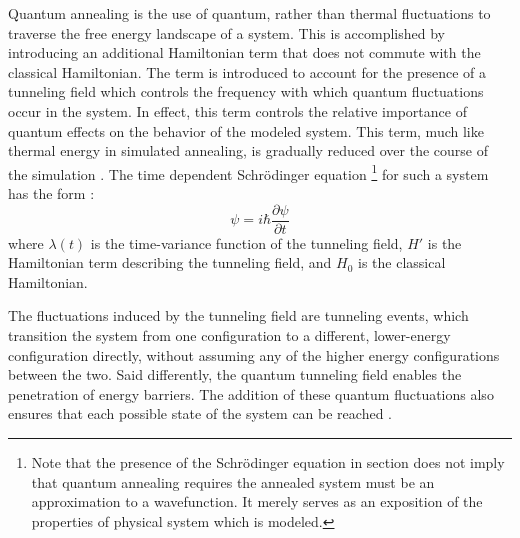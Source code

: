 \documentclass[11pt]{afthesis}
\begin{document}
	Quantum annealing is the use of quantum, rather than thermal fluctuations to traverse the free energy landscape of a system. This is accomplished by introducing an additional Hamiltonian term that does not commute with the classical Hamiltonian. The term is introduced to account for the presence of a tunneling field which controls the frequency with which quantum fluctuations occur in the system. In effect, this term controls the relative importance of quantum effects on the behavior of the modeled system. This term, much like thermal energy in simulated annealing, is gradually reduced over the course of the simulation \cite{das2005qakcs}. The time dependent Schrödinger equation \footnote{Note that the presence of the Schrödinger equation in section does not imply that quantum annealing requires the annealed system must be an approximation to a wavefunction. It merely serves as an exposition of the properties of physical system which is modeled.} for such a system has the form \cite{mukherjee2015multivariatesearchqa}: \begin{equation}
	[\lambda(t)H' + H_0]\psi = i\hbar \frac{\partial \psi}{\partial t}
	\end{equation} where \begin{math} \lambda(t) \end{math} is the time-variance function of the tunneling field, \begin{math} H' \end{math} is the Hamiltonian term describing the tunneling field, and \begin{math} H_0 \end{math} is the classical Hamiltonian. 
	
	The fluctuations induced by the tunneling field are tunneling events, which transition the system from one configuration to a different, lower-energy configuration directly, without assuming any of the higher energy configurations between the two. Said differently, the quantum tunneling field enables the penetration of energy barriers. The addition of these quantum fluctuations also ensures that each possible state of the system can be reached \cite{das2005qakcs}. 
	
	
	
\end{document}
